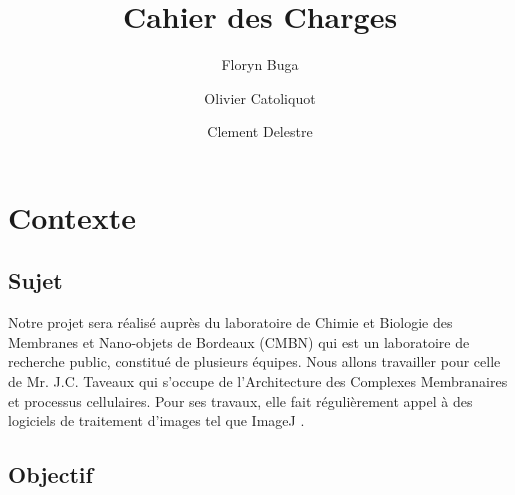 \documentclass[11pt]{report}
\begin{document}




\author{Floryn Buga\and Olivier Catoliquot\and Clement Delestre}
\title{Cahier des Charges}

\maketitle %
\tableofcontents %
\newpage
\chapter{Contexte}
\section{Sujet}
Notre projet sera réalisé auprès du laboratoire de Chimie et Biologie des Membranes et Nano-objets de Bordeaux (CMBN)  qui est un laboratoire de recherche public, constitué de plusieurs équipes. Nous allons travailler pour celle de Mr. J.C. Taveaux qui s'occupe de l'Architecture des Complexes Membranaires et processus cellulaires. Pour ses travaux, elle fait régulièrement appel à des logiciels de traitement d'images tel que ImageJ \cite{imagej}.


\section{Objectif}
\end{document}
